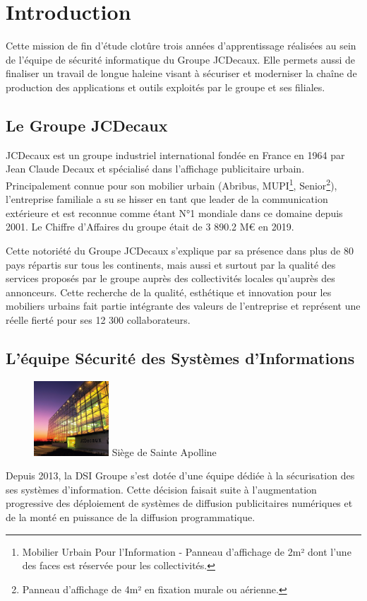 \chapter{Introduction}

Cette mission de fin d'étude clotûre trois années d'apprentissage réalisées au sein de l'équipe de sécurité informatique 
du Groupe JCDecaux. Elle permets aussi de finaliser un travail de longue haleine visant à sécuriser et moderniser
la chaîne de production des applications et outils exploités par le groupe et ses filiales.

\section{Le Groupe JCDecaux}
JCDecaux est un groupe industriel international fondée en France en 1964 par Jean Claude Decaux et spécialisé dans 
l'affichage publicitaire urbain. Principalement connue pour son mobilier urbain (Abribus, MUPI\footnote{Mobilier Urbain 
Pour l'Information - Panneau d'affichage de 2m² dont l'une des faces est réservée pour les collectivités.}, Senior\footnote{
Panneau d'affichage de 4m² en fixation murale ou aérienne.}), l'entreprise familiale a su se hisser en tant que leader de 
la communication extérieure et est reconnue comme étant N°1 mondiale dans ce domaine depuis 2001. Le Chiffre d'Affaires du 
groupe était de 3 890.2 M€ en 2019.

Cette notoriété du Groupe JCDecaux s'explique par sa présence dans plus de 80 pays répartis sur tous les continents, mais
aussi et surtout par la qualité des services proposés par le groupe auprès des collectivités locales qu'auprès des annonceurs.
Cette recherche de la qualité, esthétique et innovation pour les mobiliers urbains fait partie intégrante des valeurs de 
l'entreprise et représent une réelle fierté pour ses 12 300 collaborateurs. 

\section{L'équipe Sécurité des Systèmes d'Informations}
\begin{figure} 
    \centering \includegraphics[width=0.25\textwidth]{resources/img/jcd_pla_front.jpg}
    \centering Siège de Sainte Apolline
\end{figure}
Depuis 2013, la \ac{DSI} Groupe s'est dotée d'une équipe dédiée à la sécurisation des ses systèmes
d'information.
Cette décision faisait suite à l'augmentation progressive des déploiement de systèmes de diffusion publicitaires numériques et
de la monté en puissance de la diffusion programmatique.

